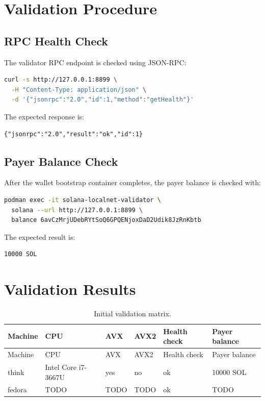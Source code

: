 \documentclass[11pt,a4paper]{article}
\begin{document}
\section{Validation Procedure}

\subsection{RPC Health Check}

The validator RPC endpoint is checked using JSON-RPC:

\begin{lstlisting}[language=bash]
curl -s http://127.0.0.1:8899 \
  -H "Content-Type: application/json" \
  -d '{"jsonrpc":"2.0","id":1,"method":"getHealth"}'
\end{lstlisting}

The expected response is:

\begin{lstlisting}
{"jsonrpc":"2.0","result":"ok","id":1}
\end{lstlisting}

\subsection{Payer Balance Check}

After the wallet bootstrap container completes, the payer balance is checked with:

\begin{lstlisting}[language=bash]
podman exec -it solana-localnet-validator \
  solana --url http://127.0.0.1:8899 \
  balance 6avCzMrjUDebRYtSoQ6GPQENjoxDaD2Udik8JzRnKbtb
\end{lstlisting}

The expected result is:

\begin{lstlisting}
10000 SOL
\end{lstlisting}

\section{Validation Results}

\begin{longtable}{p{2.7cm}p{3.2cm}p{1.2cm}p{1.3cm}p{2.2cm}p{2.2cm}}
\caption{Initial validation matrix.}\\
\toprule
Machine & CPU & AVX & AVX2 & Health check & Payer balance \\
\midrule
\endfirsthead
\toprule
Machine & CPU & AVX & AVX2 & Health check & Payer balance \\
\midrule
\endhead
think & Intel Core i7-3667U & yes & no & ok & 10000 SOL \\
fedora & TODO & TODO & TODO & ok & TODO \\
\bottomrule
\end{longtable}
\end{document}
